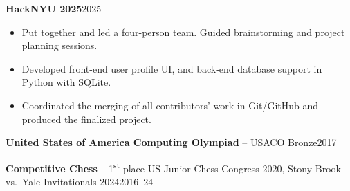 \documentclass[10pt,letterpaper]{article}
\newcommand{\entry}[2]{%
  \par\addvspace{4pt}%
  \noindent\textbf{#1}\hfill #2\par\nobreak
}
\newcommand{\mixedentry}[3]{%
  \par\addvspace{4pt}%
  \noindent\textbf{#1} #2\hfill #3\par
}
\begin{document}
\entry{HackNYU 2025}{2025}
\begin{itemize}
  \item Put together and led a four-person team. Guided brainstorming and project planning sessions.
  \item Developed front-end user profile UI, and back-end database support in Python with SQLite.
  \item Coordinated the merging of all contributors' work in Git/GitHub and produced the finalized project.
\end{itemize}

\mixedentry{United States of America Computing Olympiad}{-- USACO Bronze}{2017}

\mixedentry{Competitive Chess}{-- 1\textsuperscript{st} place US Junior Chess Congress 2020, Stony Brook vs.\ Yale Invitationals 2024}{2016--24}
\end{document}
